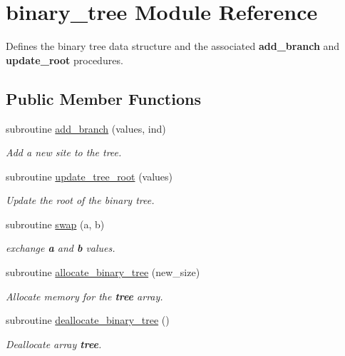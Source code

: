 \hypertarget{classbinary__tree}{
\section{binary\-\_\-tree \-Module \-Reference}
\label{classbinary__tree}
}


\-Defines the binary tree data structure and the associated {\bfseries add\-\_\-branch} and {\bfseries update\-\_\-root} procedures.  


\subsection*{\-Public \-Member \-Functions}
\begin{DoxyCompactItemize}
\item 
subroutine \hyperlink{classbinary__tree_acbc95484fe0d8cc6b619ba1be3298e03}{add\-\_\-branch} (values, ind)
\begin{DoxyCompactList}\small\item\em \-Add a new site to the tree. \end{DoxyCompactList}\item 
subroutine \hyperlink{classbinary__tree_a6591358e429920cdf6705fe71e763085}{update\-\_\-tree\-\_\-root} (values)
\begin{DoxyCompactList}\small\item\em \-Update the root of the binary tree. \end{DoxyCompactList}\item 
subroutine \hyperlink{classbinary__tree_aa68626a4b5cb1f325a1758467df69b0e}{swap} (a, b)
\begin{DoxyCompactList}\small\item\em exchange {\bfseries a} and {\bfseries b} values. \end{DoxyCompactList}\item 
subroutine \hyperlink{classbinary__tree_a2ce1b6d895d3ebd095e5772c47a5c07f}{allocate\-\_\-binary\-\_\-tree} (new\-\_\-size)
\begin{DoxyCompactList}\small\item\em \-Allocate memory for the {\bfseries tree} array. \end{DoxyCompactList}\item 
subroutine \hyperlink{classbinary__tree_a1781e6f25fb369466b12fc2fc0fab78d}{deallocate\-\_\-binary\-\_\-tree} ()
\begin{DoxyCompactList}\small\item\em \-Deallocate array {\bfseries tree}. \end{DoxyCompactList}\end{DoxyCompactItemize}
